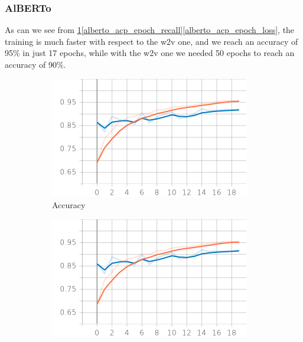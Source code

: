 \documentclass{article}
\begin{document}
            \subsubsection{AlBERTo}
            As can we see from \ref{alberto_acp_epoch_accuracy}\ref{alberto_acp_epoch_recall}\ref{alberto_acp_epoch_loss}, the training is much faster with respect to the w2v one, and we reach an accuracy of 95\% in just 17 epochs, while with the w2v one we needed 50 epochs to reach an accuracy of 90\%.
            \begin{figure}
		    \centering
		        \begin{subfigure}{.33\textwidth}
  		            \centering
 		            \includegraphics[width=\textwidth]{imgs/plots/alberto_acp_epoch_accuracy.png}
  		            \caption{Accuracy}
  		            \label{alberto_acp_epoch_accuracy}
		        \end{subfigure}%
                \begin{subfigure}{.33\textwidth}
 		            \centering
 		            \includegraphics[width=\textwidth]{imgs/plots/alberto_acp_epoch_recall.png}

\end{subfigure}
\end{figure}
\end{document}
